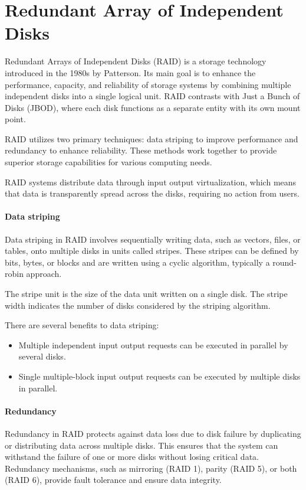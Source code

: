 \section{Redundant Array of Independent Disks}

Redundant Arrays of Independent Disks (RAID) is a storage technology introduced in the 1980s by Patterson. 
Its main goal is to enhance the performance, capacity, and reliability of storage systems by combining multiple independent disks into a single logical unit.
RAID contrasts with Just a Bunch of Disks (JBOD), where each disk functions as a separate entity with its own mount point. 

RAID utilizes two primary techniques: data striping to improve performance and redundancy to enhance reliability. 
These methods work together to provide superior storage capabilities for various computing needs.

RAID systems distribute data through input output virtualization, which means that data is transparently spread across the disks, requiring no action from users.

\paragraph*{Data striping}
Data striping in RAID involves sequentially writing data, such as vectors, files, or tables, onto multiple disks in units called stripes. 
These stripes can be defined by bits, bytes, or blocks and are written using a cyclic algorithm, typically a round-robin approach.

The stripe unit is the size of the data unit written on a single disk.
The stripe width indicates the number of disks considered by the striping algorithm.

There are several benefits to data striping:
\begin{itemize}
    \item Multiple independent input output requests can be executed in parallel by several disks.
    \item Single multiple-block input output requests can be executed by multiple disks in parallel.
\end{itemize}

\paragraph*{Redundancy}
Redundancy in RAID protects against data loss due to disk failure by duplicating or distributing data across multiple disks. 
This ensures that the system can withstand the failure of one or more disks without losing critical data. 
Redundancy mechanisms, such as mirroring (RAID 1), parity (RAID 5), or both (RAID 6), provide fault tolerance and ensure data integrity.

